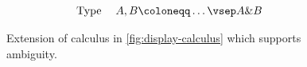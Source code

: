 \begin{figure}
  \begin{mdframed}
    \centering
    \begin{alignat*}{4}
      \text{Type}&\;&A, B&\coloneqq \ldots\vsep A\& B
    \end{alignat*}

    \begin{pfbox}
    \end{pfbox}
    \begin{pfbox}
    \end{pfbox}
    \begin{pfbox}
    \end{pfbox}
    \vspace*{\baselineskip}
  \end{mdframed}
  \caption{
    Extension of calculus in \autoref{fig:display-calculus} which
    supports ambiguity.}%
  \label{fig:extension-lexical-ambiguity}
\end{figure}

